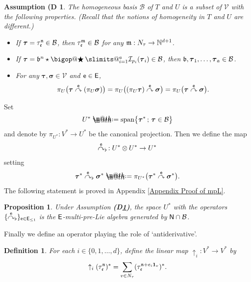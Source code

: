\documentclass[10pt, reqno]{amsart}
\makeatletter
\numberwithin{subsection}{section}
\numberwithin{subsubsection}{subsection}
\numberwithin{equation}{section} %
\theoremstyle{mystyle}
\newtheorem{prop}[thm]{\hspace{-0.13cm} {Proposition}}%
\theoremstyle{mystyle2}
\newtheorem*{defn*} {Definition}
\theoremstyle{mystyle3}
\newtheorem{assumD}{Assumption (D}
\newcommand{\refD}[1]{\textbf{\textsf{(D\ref{#1})}}}
\DeclareRobustCommand\bigop[1]{%
  \mathop{\vphantom{\sum}\mathpalette\bigop@{#1}}\slimits@
}
\newcommand{\bigop@}[2]{%
  \vcenter{%
    \sbox\z@{$#1\sum$}%
    \hbox{\resizebox{\ifx#1\displaystyle.9\fi\dimexpr\ht\z@+\dp\z@}{!}{$\m@th#2$}}%
  }%
}
\newcommand{\Bigstar}{\DOTSB\bigop{\bigstar}}
\newcommand{\bstau}{\boldsymbol{\tau}}
\newcommand{\bssigma}{\boldsymbol{\sigma}}
\newcommand{\grafting}{\overset{\sf e}{\curvearrowright}}
\newcommand{\flatgrafting}{\overset{\sf e}{\curvearrowright}_{\flat}}
\newcommand\bbN{\mathbb{N}}
\newcommand{\mcB}{\mathcal{B}}
\newcommand{\mcI}{\mathcal{I}}
\newcommand\mcV{\mathcal V}
\newcommand*{\defeq}{\mathrel{\rlap{%
                     \raisebox{0.3ex}{$\m@th\cdot$}}%
                     \raisebox{-0.3ex}{$\m@th\cdot$}}%
                     =}
\makeatother
\begin{document}
\medskip

\begin{assumD}\label{D1}
The homogeneous basis $\mcB$ of $T$ and $U$ is a subset of $\mcV$ with the following properties. (Recall that the notions of homogeneity in $T$ and $U$ are different.)
\begin{itemize}
\setlength{\itemsep}{0.1cm}
\item If $\bstau=\tau_{\frak{e}}^{\frak{n}}\in\mcB$, then $\tau_{\frak{e}}^{\frak{m}}\in\mcB$ for any $\frak{m}:N_\tau\to\bbN^{d+1}$.
\item If $\bstau=\frak{b}^n\star\Bigstar_{i=1}^a \mcI_{p_i}(\bstau_i)\in\mcB$, then $\frak{b},\bstau_1,\dots,\bstau_a\in\mcB$.
\item For any $\bstau,\bssigma\in\mcV$ and ${\sf e}\in{\sf E}$,
$$
\pi_U\big(\bstau\grafting(\pi_U\bssigma)\big) = \pi_U\big((\pi_U\bstau)\grafting\bssigma\big) = \pi_U\big(\bstau\grafting\bssigma\big).
$$
\end{itemize}
\end{assumD}

\medskip

Set 
$$
U^* \defeq  \text{\rm span}\big\{\bstau^*\,;\, \bstau\in\mcB\big\}
$$ 
and denote by $\pi_{U^*}:V^*\to U^*$ be the canonical projection. Then we 
define the map 
$$
\flatgrafting\, : U^*\otimes U^*\to U^*
$$
setting
$$
\bstau^*\flatgrafting\bssigma^* \defeq  \pi_{U^*}\big(\bstau^*\grafting\bssigma^*\big).
$$
The following statement is proved in Appendix {\sf \ref{Appendix Proof of mpL}}. 

\medskip

\begin{prop} \label{PropUniversalPreLie2}
Under Assumption \refD{D1}, the space $U^*$ with the operators $\{\flatgrafting\}_{{\sf e}\in{\sf E}_{\le1}}$ is the $\sf E$-multi-pre-Lie algebra generated by ${\sf N}\cap \mcB$.
\end{prop}   

\medskip

Finally we define an operator playing the role of `antiderivative'.

\medskip

\begin{defn*}
For each $i\in\{0,1,\dots,d\}$, define the linear map $\uparrow_i:V^*\to V^*$ by
$$
\uparrow_i(\tau_{\frak{e}}^{\frak{n}})^*
=\sum_{v\in N_\tau}(\tau_{\frak{e}}^{\frak{n}+e_i\mathbf{1}_v})^*.
$$
\end{defn*}

\medskip
\end{document}
